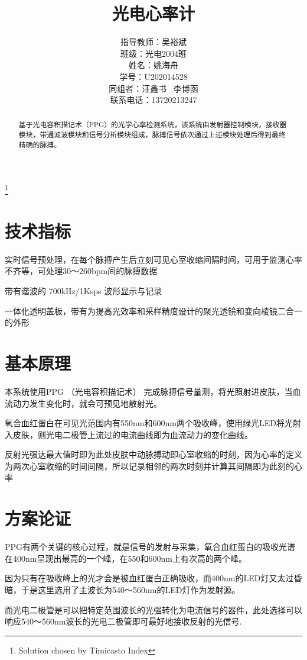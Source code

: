 \documentclass[a4paper]{ctexart}
\title{光电心率计}
\author{指导教师：吴裕斌 \\ 班级：光电2004班\\姓名：姚海舟\\学号：U202014528\\同组者：汪鑫书 \ 李博函\\联系电话：13720213247}
\begin{document}
\maketitle
\thanks{Solution chosen by Timicasto Index}
\newpage
\tableofcontents

\newpage
\begin{abstract}
	基于光电容积描记术（PPG）的光学心率检测系统，该系统由发射器控制模块，接收器模块，带通滤波模块和信号分析模块组成，脉搏信号依次通过上述模块处理后得到最终精确的脉搏。
\end{abstract}


\newpage
\section{技术指标}

	实时信号预处理，在每个脉搏产生后立刻可见心室收缩间隔时间，可用于监测心率不齐等，可处理30～260bpm间的脉搏数据
	
	带有谐波的 700kHz/1Ksps 波形显示与记录
	
	一体化透明盖板，带有为提高光效率和采样精度设计的聚光透镜和变向棱镜二合一的外形

\newpage
\section{基本原理}

	本系统使用PPG （光电容积描记术） 完成脉搏信号量测，将光照射进皮肤，当血流动力发生变化时，就会可预见地散射光。
	
	氧合血红蛋白在可见光范围内有550nm和600nm两个吸收峰，使用绿光LED将光射入皮肤，则光电二极管上流过的电流曲线即为血流动力的变化曲线。
	
	反射光强达最大值时即为此处皮肤中动脉搏动即心室收缩的时刻，因为心率的定义为两次心室收缩的时间间隔，所以记录相邻的两次时刻并计算其间隔即为此刻的心率

\newpage
\section{方案论证}
	
	PPG有两个关键的核心过程，就是信号的发射与采集，氧合血红蛋白的吸收光谱在400nm呈现出最高的一个峰，在550和600nm上有次高的两个峰。
	
	因为只有在吸收峰上的光才会是被血红蛋白正确吸收，而400nm的LED灯又太过昏暗，于是这里选用了主波长为540～560nm的LED灯作为发射源。
	
	而光电二极管是可以把特定范围波长的光强转化为电流信号的器件，此处选择可以响应540～560nm波长的光电二极管即可最好地接收反射的光信号.
	
\end{document}
